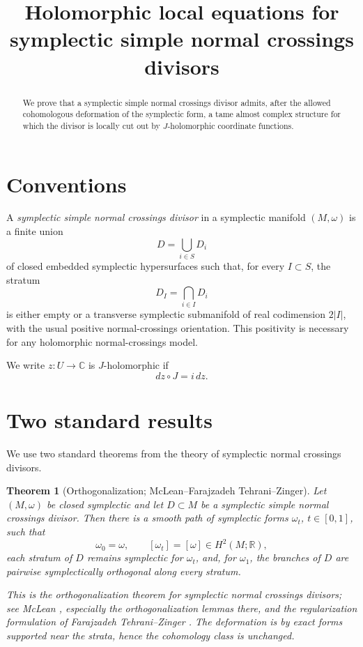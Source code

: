 \documentclass[11pt]{article}
\newtheorem{theorem}{Theorem}
\begin{document}
\title{Holomorphic local equations for symplectic simple normal crossings divisors}
\author{}
\date{}
\maketitle

\begin{abstract}
We prove that a symplectic simple normal crossings divisor admits, after the
allowed cohomologous deformation of the symplectic form, a tame almost complex
structure for which the divisor is locally cut out by $J$-holomorphic coordinate
functions.
\end{abstract}

\section*{Conventions}

A \emph{symplectic simple normal crossings divisor} in a symplectic manifold
$(M,\omega)$ is a finite union
\[
D=\bigcup_{i\in S}D_i
\]
of closed embedded symplectic hypersurfaces such that, for every
$I\subset S$, the stratum
\[
D_I=\bigcap_{i\in I}D_i
\]
is either empty or a transverse symplectic submanifold of real codimension
$2|I|$, with the usual positive normal-crossings orientation.  This positivity
is necessary for any holomorphic normal-crossings model.

We write $z:U\to \mathbb C$ is $J$-holomorphic if
\[
dz\circ J=i\,dz .
\]

\section*{Two standard results}

We use two standard theorems from the theory of symplectic normal crossings
divisors.

\begin{theorem}[Orthogonalization; McLean--Farajzadeh Tehrani--Zinger]
\label{thm:orthogonalization}
Let $(M,\omega)$ be closed symplectic and let $D\subset M$ be a symplectic
simple normal crossings divisor.  Then there is a smooth path of symplectic
forms $\omega_t$, $t\in[0,1]$, such that
\[
\omega_0=\omega,\qquad [\omega_t]=[\omega]\in H^2(M;\mathbb R),
\]
each stratum of $D$ remains symplectic for $\omega_t$, and, for $\omega_1$, the
branches of $D$ are pairwise symplectically orthogonal along every stratum.

This is the orthogonalization theorem for symplectic normal crossings divisors;
see McLean \cite[Section 5]{McLean}, especially the orthogonalization lemmas
there, and the regularization formulation of Farajzadeh Tehrani--Zinger
\cite[Theorem 1.2]{FTZ}.  The deformation is by exact forms supported near the
strata, hence the cohomology class is unchanged.
\end{theorem}
\end{document}
